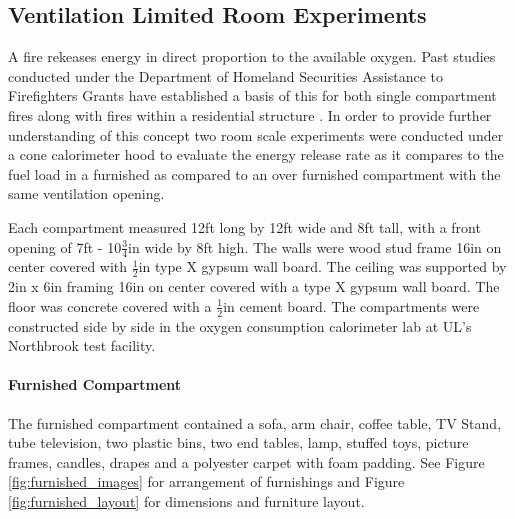 \documentclass{article}
\begin{document}
\subsection{Ventilation Limited Room Experiments}
A fire rekeases energy in direct proportion to the available oxygen. Past studies conducted under the Department of Homeland Securities Assistance to Firefighters Grants have established a basis of this for both single compartment fires along with fires within a residential structure \cite{DHS2008} \cite{DHS2010}. In order to provide further understanding of this concept two room scale experiments were conducted under a cone calorimeter hood to evaluate the energy release rate as it compares to the fuel load in a furnished as compared to an over furnished compartment with the same ventilation opening.

Each compartment measured 12ft long by 12ft wide and 8ft tall, with a front opening of 7ft - 10$\frac{3}{4}$in wide by 8ft high. The walls were wood stud frame 16in on center covered with $\frac{1}{2}$in type X gypsum wall board. The ceiling was supported by 2in x 6in framing 16in on center covered with a type X gypsum wall board. The floor was concrete covered with a $\frac{1}{2}$in cement board. The compartments were constructed side by side in the oxygen consumption calorimeter lab at UL's Northbrook test facility. 

\paragraph{Furnished Compartment} \mbox{}

The furnished compartment contained a sofa, arm chair, coffee table, TV Stand, tube television, two plastic bins, two end tables, lamp, stuffed toys, picture frames, candles, drapes and a polyester carpet with foam padding. See Figure \ref{fig:furnished_images} for arrangement of furnishings and Figure \ref{fig:furnished_layout} for dimensions and furniture layout.
\end{document}
